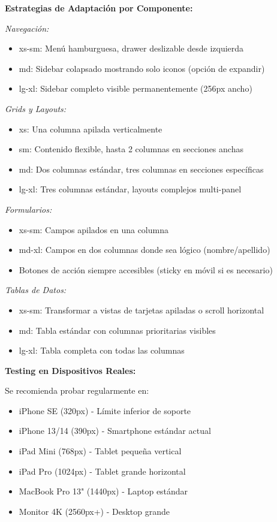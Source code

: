 \documentclass[12pt,a4paper,oneside]{article}
\begin{document}
\vspace{0.5cm}

\textbf{Estrategias de Adaptación por Componente:}

\textit{Navegación:}
\begin{itemize}
    \item xs-sm: Menú hamburguesa, drawer deslizable desde izquierda
    \item md: Sidebar colapsado mostrando solo iconos (opción de expandir)
    \item lg-xl: Sidebar completo visible permanentemente (256px ancho)
\end{itemize}

\textit{Grids y Layouts:}
\begin{itemize}
    \item xs: Una columna apilada verticalmente
    \item sm: Contenido flexible, hasta 2 columnas en secciones anchas
    \item md: Dos columnas estándar, tres columnas en secciones específicas
    \item lg-xl: Tres columnas estándar, layouts complejos multi-panel
\end{itemize}

\textit{Formularios:}
\begin{itemize}
    \item xs-sm: Campos apilados en una columna
    \item md-xl: Campos en dos columnas donde sea lógico (nombre/apellido)
    \item Botones de acción siempre accesibles (sticky en móvil si es necesario)
\end{itemize}

\textit{Tablas de Datos:}
\begin{itemize}
    \item xs-sm: Transformar a vistas de tarjetas apiladas o scroll horizontal
    \item md: Tabla estándar con columnas prioritarias visibles
    \item lg-xl: Tabla completa con todas las columnas
\end{itemize}

\textbf{Testing en Dispositivos Reales:}

Se recomienda probar regularmente en:
\begin{itemize}
    \item iPhone SE (320px) - Límite inferior de soporte
    \item iPhone 13/14 (390px) - Smartphone estándar actual
    \item iPad Mini (768px) - Tablet pequeña vertical
    \item iPad Pro (1024px) - Tablet grande horizontal
    \item MacBook Pro 13" (1440px) - Laptop estándar
    \item Monitor 4K (2560px+) - Desktop grande
\end{itemize}
\end{document}
